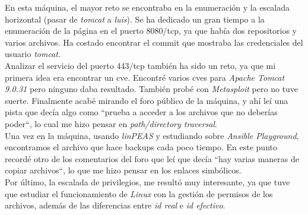 En esta máquina, el mayor reto se encontraba en la enumeración y la escalada horizontal (pasar de \textit{tomcat} a \textit{luis}). Se ha dedicado un gran tiempo a la enumeración de la página en el puerto 8080/\acrshort{tcp}, ya que había dos repositorios y varios archivos. Ha costado encontrar el commit que mostraba las credenciales del usuario \textit{tomcat}.\\

Analizar el servicio del puerto 443/\acrshort{tcp} también ha sido un reto, ya que mi primera idea era encontrar un \acrshort{cve}. Encontré varios \acrshort{cve}s para \textit{Apache Tomcat 9.0.31} pero ninguno daba resultado. También probé con \textit{Metasploit} pero no tuve suerte. Finalmente acabé mirando el foro público de la máquina\cite{seal-forum}, y ahí leí una pista que decía algo como ``prueba a acceder a los archivos que no deberías poder``, lo cual me hizo pensar en \textit{path/directory traversal}.\\

Una vez en la máquina, usando \textit{linPEAS} y estudiando sobre \textit{Ansible Playground}, encontramos el archivo que hace backups cada poco tiempo. En este punto recordé otro de los comentarios del foro que leí que decía ``hay varias maneras de copiar archivos``, lo que me hizo pensar en los enlaces simbólicos.\\

Por último, la escalada de privilegios, me resultó muy interesante, ya que tuve que estudiar el funcionamiento de \textit{Linux} con la gestión de permisos de los archivos, además de las diferencias entre \textit{id real} e \textit{id efectivo}.\\